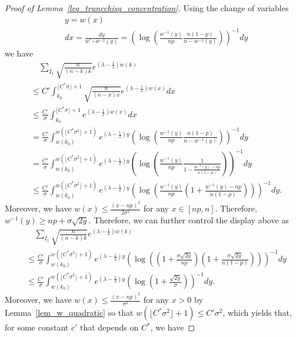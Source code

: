 \documentclass[10pt,a4paper]{amsart}
\begin{document}
\begin{proof}[Proof of Lemma~\ref{leq_truncchisq_concentration}]
Using the change of variables 
\begin{align*}
    & y = w(x)\\
    & dx = \frac{dy}{w' \circ w^{-1}(y)} = \left(\log\left(\frac{w^{-1}(y)}{np} \frac{n(1-p)}{n-w^{-1}(y)}\right)\right)^{-1} dy
\end{align*}
we have  
\begin{align*}
    & \quad \sum_{I_1} \sqrt{\frac{n}{(n-k)k}} e^{\left(\lambda - \frac{1}{2}\right)w(k)}\\
    & \leq C'\int_{k_0}^{\lfloor C^*\sigma\rfloor +1} \sqrt{\frac{n}{(n-x) x}} e^{(\lambda - \frac{1}{2}) w(x)} dx\\
    & \leq \frac{C'}{\sigma}\int_{k_0}^{\lfloor C^*\sigma\rfloor +1}  e^{(\lambda - \frac{1}{2}) w(x)} dx\\
    & = \frac{C'}{\sigma} \int_{w(k_0)}^{w(\lfloor C^*\sigma^2\rfloor + 1)} e^{(\lambda - \frac{1}{2}) y} \left(\log\left(\frac{w^{-1}(y)}{np} \frac{n(1-p)}{n-w^{-1}(y)}\right)\right)^{-1} dy\\  
    & = \frac{C'}{\sigma} \int_{w(k_0)}^{w(\lfloor C^*\sigma^2\rfloor + 1)} e^{(\lambda - \frac{1}{2}) y} \left(\log\left(\frac{w^{-1}(y)}{np} \frac{1}{1 - \frac{w^{-1}(y) - np}{n(1-p)}}\right)\right)^{-1} dy\\
    & \leq \frac{C'}{\sigma} \int_{w(k_0)}^{w(\lfloor C^*\sigma^2\rfloor + 1)} e^{(\lambda - \frac{1}{2}) y} \left(\log\left(\frac{w^{-1}(y)}{np} \left(1+\frac{ w^{-1}(y) - np}{n(1-p)}\right)\right)\right)^{-1} dy.
\end{align*}
Moreover, we have 
$w(x) \leq \frac{(x-np)^2}{2\sigma^2}$ for any $x \in [np,n]$. 
Therefore, $w^{-1}(y) \geq 
 np + \sigma \sqrt{2y}$. Therefore, we can further control the display above as
 \begin{align*}
     & \quad \sum_{I_1} \sqrt{\frac{n}{(n-k)k}} e^{\left(\lambda - \frac{1}{2}\right)w(k)}\\
     & \leq \frac{C'}{\sigma} \int_{w(k_0)}^{w(\lfloor C^*\sigma^2\rfloor + 1)} e^{(\lambda - \frac{1}{2}) y} \left(\log\left(\left(1+ \frac{\sigma\sqrt{2y}}{np}\right) \left(1+\frac{\sigma\sqrt{2y}}{n(1-p)}\right)\right)\right)^{-1} dy\\
     & \leq \frac{C'}{\sigma} \int_{w(k_0)}^{w(\lfloor C^*\sigma^2\rfloor + 1)} e^{(\lambda - \frac{1}{2}) y} \left(\log\left(1+ \frac{\sqrt{2y}}{\sigma}\right)\right)^{-1} dy.
 \end{align*}
Moreover, we have $w(x) \leq \frac{(x-np)^2}{\sigma^2} $ for any $x >0$ by Lemma~\ref{lem_w_quadratic} so that $w(\lfloor C^*\sigma^2\rfloor + 1) \leq C' \sigma^2$, which yields that, for some constant $c'$ that depends on $C^*$, we have

\end{proof}
\end{document}
